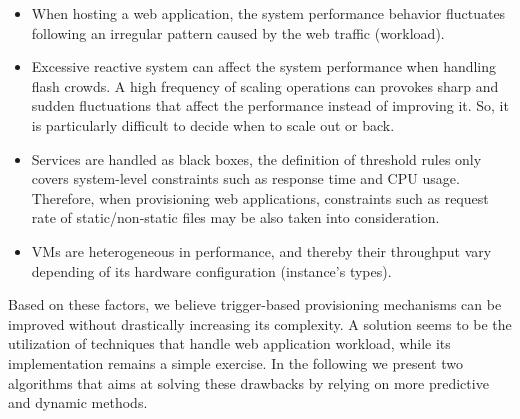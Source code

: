 \begin{itemize}
\item  When hosting a web application, the system performance behavior fluctuates following an irregular pattern caused by the web traffic (workload). 


\item Excessive reactive system can affect the system performance when handling flash crowds. A high frequency of scaling operations can provokes sharp and sudden fluctuations that affect the performance instead of improving it. So, it is particularly difficult to decide when to scale out or back. 

\item Services are handled as black boxes, the definition of threshold rules only covers system-level constraints such as response time and CPU usage. Therefore, when provisioning web applications, constraints such as request rate of static/non-static files may be also taken into consideration.



\item VMs are heterogeneous in performance, and thereby their throughput vary depending of its hardware configuration (instance's types).


\end{itemize}

Based on these factors, we believe trigger-based provisioning mechanisms can be improved without drastically increasing its complexity. A solution seems to be the utilization of techniques that handle web application workload, while its implementation remains a simple exercise. In the following we present two algorithms that aims at solving these drawbacks by relying on more predictive and dynamic methods.





